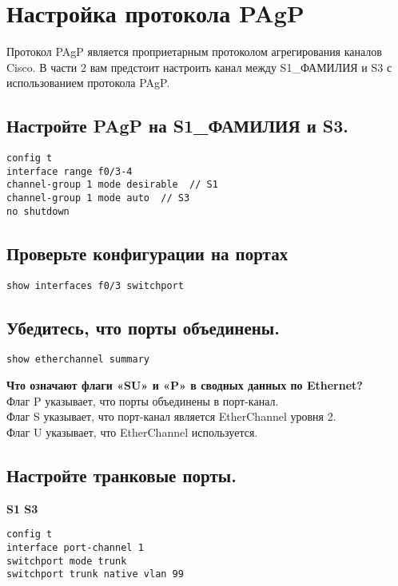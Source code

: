 \section{Настройка протокола PAgP}
Протокол PAgP является проприетарным протоколом агрегирования каналов Cisco. В части 2 вам
предстоит настроить канал между S1_ФАМИЛИЯ и S3 с использованием протокола PAgP.

\subsection{Настройте PAgP на S1_ФАМИЛИЯ и S3.}
\begin{verbatim}
config t
interface range f0/3-4
channel-group 1 mode desirable  // S1
channel-group 1 mode auto  // S3
no shutdown
\end{verbatim}

\subsection{Проверьте конфигурации на портах}
\begin{verbatim}
show interfaces f0/3 switchport
\end{verbatim}


\subsection{Убедитесь, что порты объединены.}
\begin{verbatim}
show etherchannel summary
\end{verbatim}


\textbf{Что означают флаги «SU» и «P» в сводных данных по Ethernet?}\\
Флаг P указывает, что порты объединены в порт-канал.\\
Флаг S указывает, что порт-канал является EtherChannel уровня 2.\\
Флаг U указывает, что EtherChannel используется.\\

\subsection{Настройте транковые порты.}

\textbf{S1 S3}

\begin{verbatim}
config t
interface port-channel 1
switchport mode trunk
switchport trunk native vlan 99
\end{verbatim}

